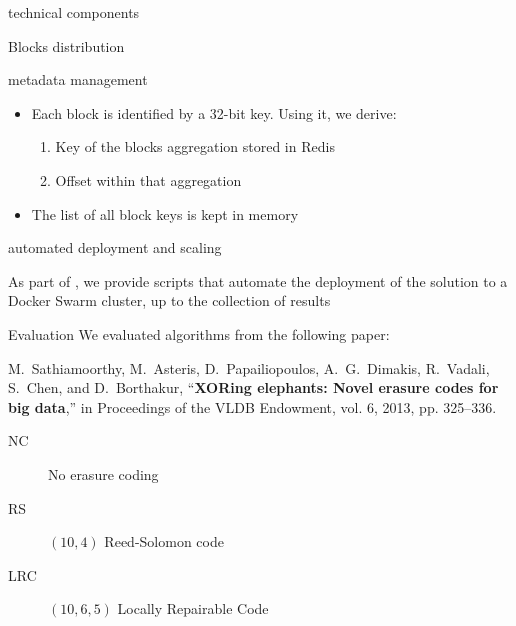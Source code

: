 \begin{frame}{\sys \enspace technical components}
    \centering
    
\end{frame}

\begin{frame}{Blocks distribution}
    \centering
    
\end{frame}

\begin{frame}{\sys\enspace metadata management}
  \begin{itemize}
  \item Each block is identified by a 32-bit key. Using it, we derive:
    \begin{enumerate}
        \item Key of the blocks aggregation stored in Redis
        \item Offset within that aggregation
    \end{enumerate}
    
    \item The list of all block keys is kept in memory

  \end{itemize}
\end{frame}

\begin{frame}{\sys\enspace automated deployment and scaling}
  \begin{snugshade}
    As part of \sys, we provide scripts that automate the deployment of the solution to a Docker Swarm cluster, up to the collection of results
  \end{snugshade}
\end{frame}

\subtitle[Evaluation]{Evaluation}

\begin{frame}{Evaluation}
    We evaluated algorithms from the following paper:

    \begin{snugshade}
        \footnotesize
        M.~Sathiamoorthy, M.~Asteris, D.~Papailiopoulos, A.~G.~Dimakis, R.~Vadali, S.~Chen, and D.~Borthakur, “\textbf{XORing elephants: Novel erasure codes for big data},” in Proceedings of the VLDB Endowment, vol. 6, 2013, pp. 325–336.
    \end{snugshade}
    
    \begin{description}
        \item[NC] No erasure coding
        \item[RS] $(10,4)$ Reed-Solomon code
        \item[LRC] $(10,6,5)$ Locally Repairable Code
    \end{description}
\end{frame}


